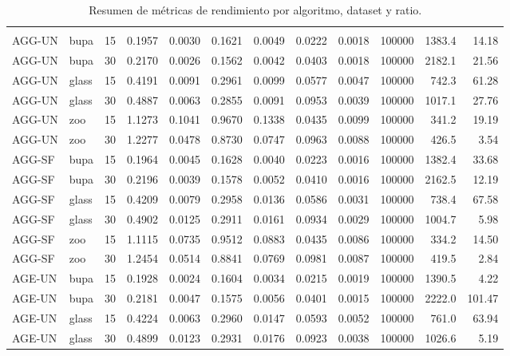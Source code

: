 \begin{longtable}{llcrrrrrrrrr}
    \bottomrule
    \noalign{\vspace{10pt}}
    \caption{Resumen de métricas de rendimiento por algoritmo, dataset y ratio.} \label{tab:metricas_resultados} \\
    \endlastfoot
    AGG-UN & bupa & 15 & 0.1957 & 0.0030 & 0.1621 & 0.0049 & 0.0222 & 0.0018 & 100000 & 1383.4 & 14.18 \\
    AGG-UN & bupa & 30 & 0.2170 & 0.0026 & 0.1562 & 0.0042 & 0.0403 & 0.0018 & 100000 & 2182.1 & 21.56 \\
    AGG-UN & glass & 15 & 0.4191 & 0.0091 & 0.2961 & 0.0099 & 0.0577 & 0.0047 & 100000 & 742.3 & 61.28 \\
    AGG-UN & glass & 30 & 0.4887 & 0.0063 & 0.2855 & 0.0091 & 0.0953 & 0.0039 & 100000 & 1017.1 & 27.76 \\
    AGG-UN & zoo & 15 & 1.1273 & 0.1041 & 0.9670 & 0.1338 & 0.0435 & 0.0099 & 100000 & 341.2 & 19.19 \\
    AGG-UN & zoo & 30 & 1.2277 & 0.0478 & 0.8730 & 0.0747 & 0.0963 & 0.0088 & 100000 & 426.5 & 3.54 \\
    \midrule
    AGG-SF & bupa & 15 & 0.1964 & 0.0045 & 0.1628 & 0.0040 & 0.0223 & 0.0016 & 100000 & 1382.4 & 33.68 \\
    AGG-SF & bupa & 30 & 0.2196 & 0.0039 & 0.1578 & 0.0052 & 0.0410 & 0.0016 & 100000 & 2162.5 & 12.19 \\
    AGG-SF & glass & 15 & 0.4209 & 0.0079 & 0.2958 & 0.0136 & 0.0586 & 0.0031 & 100000 & 738.4 & 67.58 \\
    AGG-SF & glass & 30 & 0.4902 & 0.0125 & 0.2911 & 0.0161 & 0.0934 & 0.0029 & 100000 & 1004.7 & 5.98 \\
    AGG-SF & zoo & 15 & 1.1115 & 0.0735 & 0.9512 & 0.0883 & 0.0435 & 0.0086 & 100000 & 334.2 & 14.50 \\
    AGG-SF & zoo & 30 & 1.2454 & 0.0514 & 0.8841 & 0.0769 & 0.0981 & 0.0087 & 100000 & 419.5 & 2.84 \\
    \midrule
    AGE-UN & bupa & 15 & 0.1928 & 0.0024 & 0.1604 & 0.0034 & 0.0215 & 0.0019 & 100000 & 1390.5 & 4.22 \\
    AGE-UN & bupa & 30 & 0.2181 & 0.0047 & 0.1575 & 0.0056 & 0.0401 & 0.0015 & 100000 & 2222.0 & 101.47 \\
    AGE-UN & glass & 15 & 0.4224 & 0.0063 & 0.2960 & 0.0147 & 0.0593 & 0.0052 & 100000 & 761.0 & 63.94 \\
    AGE-UN & glass & 30 & 0.4899 & 0.0123 & 0.2931 & 0.0176 & 0.0923 & 0.0038 & 100000 & 1026.6 & 5.19 \\

\end{longtable}
